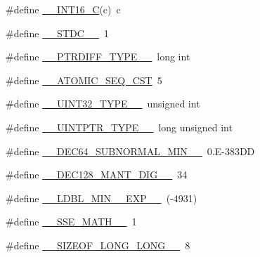 \begin{DoxyCompactItemize}
\#define \hyperlink{build-analizer__host-_desktop___qt__5__9__0___g_c_c__64bit-debug_2moc__predefs_8h_acefa39ff476ff22ce343809fff1e8bc1}{\+\_\+\+\_\+\+I\+N\+T16\+\_\+\+C}(c)~c
\item 
\#define \hyperlink{build-analizer__host-_desktop___qt__5__9__0___g_c_c__64bit-debug_2moc__predefs_8h_a8bdd19cad331a646ae8375be00e34cb3}{\+\_\+\+\_\+\+S\+T\+D\+C\+\_\+\+\_\+}~1
\item 
\#define \hyperlink{build-analizer__host-_desktop___qt__5__9__0___g_c_c__64bit-debug_2moc__predefs_8h_a726a020189392103a9404da070536e07}{\+\_\+\+\_\+\+P\+T\+R\+D\+I\+F\+F\+\_\+\+T\+Y\+P\+E\+\_\+\+\_\+}~long int
\item 
\#define \hyperlink{build-analizer__host-_desktop___qt__5__9__0___g_c_c__64bit-debug_2moc__predefs_8h_a0609dc2b702d5980de44c01bd373136a}{\+\_\+\+\_\+\+A\+T\+O\+M\+I\+C\+\_\+\+S\+E\+Q\+\_\+\+C\+S\+T}~5
\item 
\#define \hyperlink{build-analizer__host-_desktop___qt__5__9__0___g_c_c__64bit-debug_2moc__predefs_8h_af4eb6c3c4da52a7fe202626ac4dc360e}{\+\_\+\+\_\+\+U\+I\+N\+T32\+\_\+\+T\+Y\+P\+E\+\_\+\+\_\+}~unsigned int
\item 
\#define \hyperlink{build-analizer__host-_desktop___qt__5__9__0___g_c_c__64bit-debug_2moc__predefs_8h_a1c54273d3f148c51ad48fd738d1e6cbe}{\+\_\+\+\_\+\+U\+I\+N\+T\+P\+T\+R\+\_\+\+T\+Y\+P\+E\+\_\+\+\_\+}~long unsigned int
\item 
\#define \hyperlink{build-analizer__host-_desktop___qt__5__9__0___g_c_c__64bit-debug_2moc__predefs_8h_a6d3e36bb5d7e7ce3eda28fb174e404c6}{\+\_\+\+\_\+\+D\+E\+C64\+\_\+\+S\+U\+B\+N\+O\+R\+M\+A\+L\+\_\+\+M\+I\+N\+\_\+\+\_\+}~0.\+E-\/383\+D\+D
\item 
\#define \hyperlink{build-analizer__host-_desktop___qt__5__9__0___g_c_c__64bit-debug_2moc__predefs_8h_adeff56b51aead6443852cacac294d464}{\+\_\+\+\_\+\+D\+E\+C128\+\_\+\+M\+A\+N\+T\+\_\+\+D\+I\+G\+\_\+\+\_\+}~34
\item 
\#define \hyperlink{build-analizer__host-_desktop___qt__5__9__0___g_c_c__64bit-debug_2moc__predefs_8h_aa0d249d82751bd4ee0280990bc510371}{\+\_\+\+\_\+\+L\+D\+B\+L\+\_\+\+M\+I\+N\+\_\+\_\+\+E\+X\+P\+\_\+\+\_\+}~(-\/4931)
\item 
\#define \hyperlink{build-analizer__host-_desktop___qt__5__9__0___g_c_c__64bit-debug_2moc__predefs_8h_ad378f6ccbd0d54016bda020b78adbbcb}{\+\_\+\+\_\+\+S\+S\+E\+\_\+\+M\+A\+T\+H\+\_\+\+\_\+}~1
\item 
\#define \hyperlink{build-analizer__host-_desktop___qt__5__9__0___g_c_c__64bit-debug_2moc__predefs_8h_a68e0683c8f359f7d7e013706fbcc2040}{\+\_\+\+\_\+\+S\+I\+Z\+E\+O\+F\+\_\+\+L\+O\+N\+G\+\_\+\+L\+O\+N\+G\+\_\+\+\_\+}~8

\end{DoxyCompactItemize}
